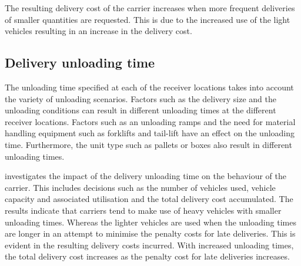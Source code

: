 The resulting delivery cost of the carrier increases when more frequent deliveries of smaller quantities are requested. This is due to the increased use of the light vehicles resulting in an increase in the delivery cost.

\subsection{Delivery unloading time}
The unloading time specified at each of the receiver locations takes into account the variety of unloading scenarios. Factors such as the delivery size and the unloading conditions can result in different unloading times at the different receiver locations. Factors such as an unloading ramps and the need for material handling equipment such as forklifts and tail-lift have an effect on the unloading time. Furthermore, the unit type such as pallets or boxes also result in different unloading times. \par

\citet{bean2019behavioural} investigates the impact of the delivery unloading time on the behaviour of the carrier. This includes decisions such as the number of vehicles used, vehicle capacity and associated utilisation and the total delivery cost accumulated. The results indicate that carriers tend to make use of heavy vehicles with smaller unloading times. Whereas the lighter vehicles are used when the unloading times are longer in an attempt to minimise the penalty costs for late deliveries. This is evident in the resulting delivery costs incurred. With increased unloading times, the total delivery cost increases as the penalty cost for late deliveries increases.

